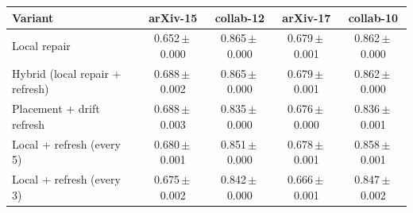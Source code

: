 \begin{tabular}{l cccc}
\toprule
Variant & arXiv-15 & collab-12 & arXiv-17 & collab-10\\
\midrule
Local repair & 0.652\,$\pm$\,0.000 & 0.865\,$\pm$\,0.000 & 0.679\,$\pm$\,0.001 & 0.862\,$\pm$\,0.000 \\
Hybrid (local repair + refresh) & 0.688\,$\pm$\,0.002 & 0.865\,$\pm$\,0.000 & 0.679\,$\pm$\,0.001 & 0.862\,$\pm$\,0.000 \\
Placement + drift refresh & 0.688\,$\pm$\,0.003 & 0.835\,$\pm$\,0.000 & 0.676\,$\pm$\,0.000 & 0.836\,$\pm$\,0.001 \\
Local + refresh (every 5) & 0.680\,$\pm$\,0.001 & 0.851\,$\pm$\,0.000 & 0.678\,$\pm$\,0.001 & 0.858\,$\pm$\,0.001 \\
Local + refresh (every 3) & 0.675\,$\pm$\,0.002 & 0.842\,$\pm$\,0.000 & 0.666\,$\pm$\,0.001 & 0.847\,$\pm$\,0.002 \\
\bottomrule
\end{tabular}
